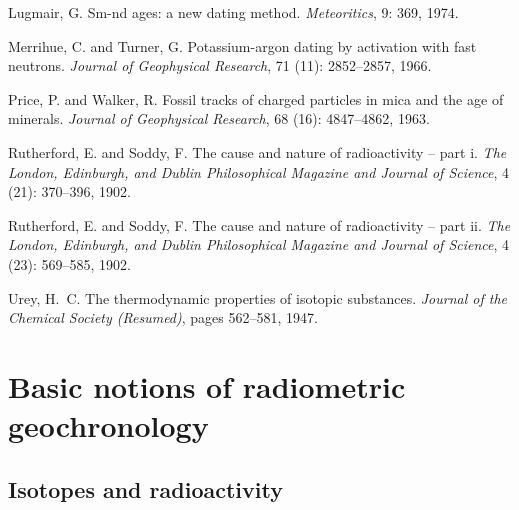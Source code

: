 \documentclass{book}
\begin{document}
\begin{thebibliography}{16}
Lugmair, G.
\newblock Sm-nd ages: a new dating method.
\newblock \emph{Meteoritics}, 9: 369, 1974.

Merrihue, C. and Turner, G.
\newblock Potassium-argon dating by activation with fast neutrons.
\newblock \emph{Journal of Geophysical Research}, 71 (11):
  2852--2857, 1966.

Price, P. and Walker, R.
\newblock Fossil tracks of charged particles in mica and the age of minerals.
\newblock \emph{Journal of Geophysical Research}, 68 (16):
  4847--4862, 1963.

Rutherford, E. and Soddy, F.
\newblock The cause and nature of radioactivity -- part i.
\newblock \emph{The London, Edinburgh, and Dublin Philosophical Magazine and
  Journal of Science}, 4 (21): 370--396, 1902{}.

Rutherford, E. and Soddy, F.
\newblock The cause and nature of radioactivity -- part ii.
\newblock \emph{The London, Edinburgh, and Dublin Philosophical Magazine and
  Journal of Science}, 4 (23): 569--585, 1902{}.

Urey, H.~C.
\newblock The thermodynamic properties of isotopic substances.
\newblock \emph{Journal of the Chemical Society (Resumed)}, pages 562--581,
  1947.

\end{thebibliography}


%
%

\chapter[Basic Notions]{Basic notions of radiometric geochronology}
\label{sec:basic-notions}

\section{Isotopes and radioactivity}
\label{sec:isotopes}
\end{document}
